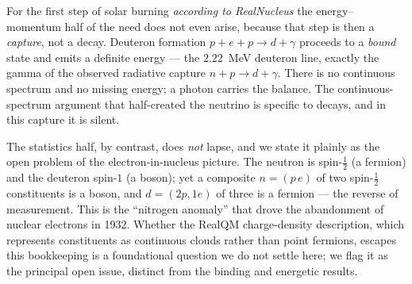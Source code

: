 \documentclass[11pt]{article}
\begin{document}
For the first step of solar burning \emph{according to RealNucleus} the energy--momentum half of the
need does not even arise, because that step is then a \emph{capture}, not a decay. Deuteron formation $p+e+p\to d+\gamma$ proceeds to a
\emph{bound} state and emits a definite energy --- the $2.22$~MeV deuteron line, exactly the gamma of
the observed radiative capture $n+p\to d+\gamma$. There is no continuous spectrum and no missing
energy; a photon carries the balance. The continuous-spectrum argument that half-created the neutrino
is specific to decays, and in this capture it is silent.

The statistics half, by contrast, does \emph{not} lapse, and we state it plainly as the open problem of
the electron-in-nucleus picture. The neutron is spin-$\tfrac12$ (a fermion) and the deuteron spin-$1$ (a
boson); yet a composite $n=(p\,e)$ of two spin-$\tfrac12$ constituents is a boson, and $d=(2p,1e)$ of
three is a fermion --- the reverse of measurement. This is the ``nitrogen anomaly'' that drove the
abandonment of nuclear electrons in 1932. Whether the RealQM charge-density description, which
represents constituents as continuous clouds rather than point fermions, escapes this bookkeeping is a
foundational question we do not settle here; we flag it as the principal open issue, distinct from the
binding and energetic results.
\end{document}
